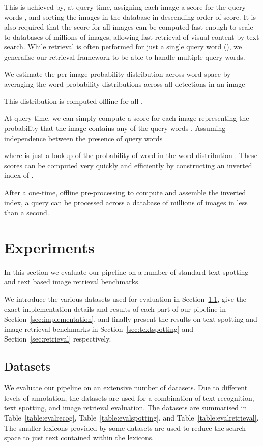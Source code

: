 \documentclass[twocolumn]{svjour3}          \smartqed  \usepackage{epsfig}
\begin{document}
This is achieved by, at query time, assigning each image  a score  for the query words , and sorting the images in the database  in descending order of score. It is also required that the score for all images can be computed fast enough to scale to databases of millions of images, allowing fast retrieval of visual content by text search. While retrieval is often performed for just a single query word (), we generalise our retrieval framework to be able to handle multiple query words.

We estimate the per-image probability distribution across word space  by averaging the word probability distributions across all detections  in an image

This distribution is computed offline for all .

At query time, we can simply compute a score for each image  representing the probability that the image  contains any of the query words . Assuming independence between the presence of query words

where  is just a lookup of the probability of word  in the word distribution . 
These scores can be computed very quickly and efficiently by constructing an inverted index of .

After a one-time, offline pre-processing to compute  and assemble the inverted index, a query can be processed across a database of millions of images in less than a second.

\section{Experiments}
\label{sec:experiments}

In this section we evaluate our pipeline on a number of standard text spotting and text based image retrieval benchmarks. 

We introduce the various datasets used for evaluation in Section~\ref{sec:datasets}, give the exact implementation details and results of each part of our pipeline in Section~\ref{sec:implementation}, and finally present the results on text spotting and image retrieval benchmarks in Section~\ref{sec:textspotting} and Section~\ref{sec:retrieval} respectively.

\subsection{Datasets}
\label{sec:datasets}
We evaluate our pipeline on an extensive number of datasets. Due to different levels of annotation, the datasets are used for a combination of text recognition, text spotting, and image retrieval evaluation. The datasets are summarised in Table~\ref{table:evalrecog}, Table~\ref{table:evalspotting}, and Table~\ref{table:evalretrieval}. The smaller lexicons provided by some datasets are used to reduce the search space to just text contained within the lexicons.
\end{document}
